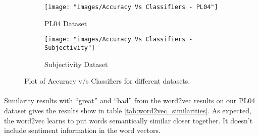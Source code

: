 \documentclass[a4paper,26pt]{article}
\begin{document}
\begin{figure}[H]
    \centering
    \begin{subfigure}[b]{0.45\textwidth}
        \centering
        \texttt{[image: "images/Accuracy Vs Classifiers - PL04"]}
        \caption{PL04 Dataset}
    \end{subfigure}
    \hfill
    \begin{subfigure}[b]{0.45\textwidth}
        \centering
        \texttt{[image: "images/Accuracy Vs Classifiers - Subjectivity"]}
        \caption{Subjectivity Dataset}
    \end{subfigure}
    \caption{Plot of Accuracy v/s Classifiers for different datasets.}
    \label{fig:accuracyplot}
\end{figure}

\paragraph{}
Similarity results with ``great'' and ``bad'' from the word2vec results on our PL04 dataset gives the results show in table \ref{tab:word2vec_similarities}. As expected, the word2vec learns to put words semantically similar closer together. It doesn't include sentiment information in the word vectors. 
\end{document}
